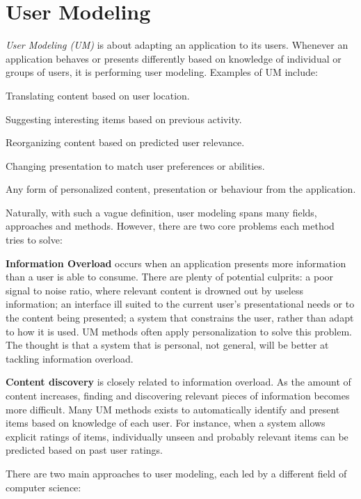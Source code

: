\section{User Modeling}

\emph{User Modeling (UM)} is about adapting an application to its users.
Whenever an application behaves or presents differently based on knowledge
of individual or groups of users, it is performing user modeling. 
Examples of UM include:

\begin{itemize*}
  \item Translating content based on user location.
  \item Suggesting interesting items based on previous activity.
  \item Reorganizing content based on predicted user relevance.
  \item Changing presentation to match user preferences or abilities.
  \item Any form of personalized content, presentation or behaviour from the application.
\end{itemize*}

Naturally, with such a vague definition, user modeling spans many fields,
approaches and methods. However, there are two core problems each method tries to solve:

\textbf{Information Overload} occurs when an application presents more information than a user is able to consume.
\cite{Bjorkoy2010d}
There are plenty of potential culprits: a poor signal to noise ratio, where relevant content is drowned out by useless 
information; an interface ill suited to the current user’s presentational needs or to the content being presented; 
a system that constrains the user, rather than adapt to how it is used. UM methods often apply personalization to solve this problem.
The thought is that a system that is personal, not general, will be better at tackling information overload.

\textbf{Content discovery} is closely related to information overload. As the amount of content increases,
finding and discovering relevant pieces of information becomes more difficult. Many UM methods
exists to automatically identify and present items based on knowledge of each user. For instance,
when a system allows explicit ratings of items, individually unseen and probably relevant items can be predicted
based on past user ratings.


There are two main approaches to user modeling, each led by a different field of computer science:

